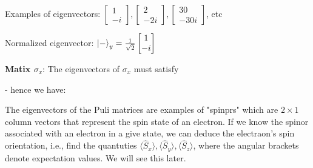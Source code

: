 \documentclass{article}
\begin{document}
Examples of eigenvectors: $
\begin{bmatrix}
1 \\ -i
\end{bmatrix},
\begin{bmatrix}
2 \\ -2i
\end{bmatrix},
\begin{bmatrix}
30 \\ -30i
\end{bmatrix}
$, etc

Normalized eigenvector: $ \ket{-}_y =  \frac{1}{\sqrt{2}}\begin{bmatrix}
1 \\ -i
\end{bmatrix}
$


\textbf{Matix $\sigma_x$}: The eigenvectors of $\sigma_x$ must satisfy


- hence we have:



The eigenvectors of the Puli matrices are examples of "spinprs" which are $2 \times 1$ column vectors that represent the spin state of an electron. If we know the spinor associated with an electron in a give state, we can deduce the electraon's spin orientation, i.e., find the quantuties $\langle \hat{S}_x \rangle, \langle \hat{S}_y \rangle, \langle \hat{S}_z \rangle$, where the angular brackets denote expectation values. We will see this later.
\end{document}
